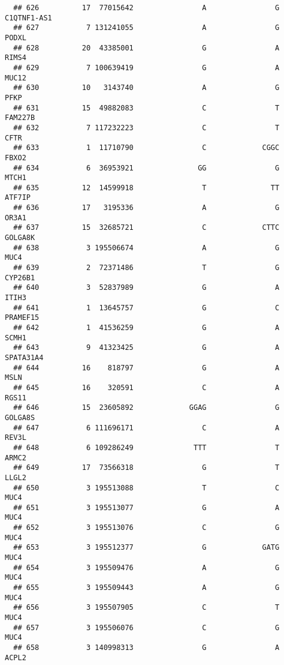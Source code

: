 \documentclass[12pt,twoside]{reedthesis}
\theoremstyle{definition}
\theoremstyle{definition}
\theoremstyle{remark}
\begin{document}
\begin{verbatim}
  ## 626          17  77015642                A                G    C1QTNF1-AS1
  ## 627           7 131241055                A                G          PODXL
  ## 628          20  43385001                G                A          RIMS4
  ## 629           7 100639419                G                A          MUC12
  ## 630          10   3143740                A                G           PFKP
  ## 631          15  49882083                C                T        FAM227B
  ## 632           7 117232223                C                T           CFTR
  ## 633           1  11710790                C             CGGC          FBXO2
  ## 634           6  36953921               GG                G          MTCH1
  ## 635          12  14599918                T               TT         ATF7IP
  ## 636          17   3195336                A                G          OR3A1
  ## 637          15  32685721                C             CTTC        GOLGA8K
  ## 638           3 195506674                A                G           MUC4
  ## 639           2  72371486                T                G        CYP26B1
  ## 640           3  52837989                G                A          ITIH3
  ## 641           1  13645757                G                C       PRAMEF15
  ## 642           1  41536259                G                A          SCMH1
  ## 643           9  41323425                G                A      SPATA31A4
  ## 644          16    818797                G                A           MSLN
  ## 645          16    320591                C                A          RGS11
  ## 646          15  23605892             GGAG                G        GOLGA8S
  ## 647           6 111696171                C                A          REV3L
  ## 648           6 109286249              TTT                T          ARMC2
  ## 649          17  73566318                G                T          LLGL2
  ## 650           3 195513088                T                C           MUC4
  ## 651           3 195513077                G                A           MUC4
  ## 652           3 195513076                C                G           MUC4
  ## 653           3 195512377                G             GATG           MUC4
  ## 654           3 195509476                A                G           MUC4
  ## 655           3 195509443                A                G           MUC4
  ## 656           3 195507905                C                T           MUC4
  ## 657           3 195506076                C                G           MUC4
  ## 658           3 140998313                G                A          ACPL2

\end{verbatim}
\end{document}
